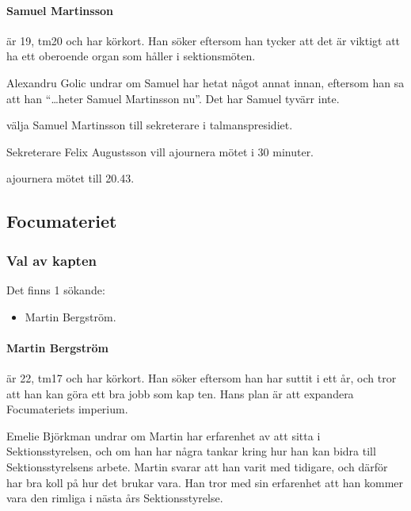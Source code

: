 \documentclass[hidelinks]{sektionsmote}
\begin{document}
\paragraph{Samuel Martinsson} är 19, tm20 och har körkort.
Han söker eftersom han tycker att det är viktigt att ha ett oberoende organ som håller i sektionsmöten.

Alexandru Golic undrar om Samuel har hetat något annat innan, eftersom han sa att han \enquote{\dots heter Samuel Martinsson nu}.
Det har Samuel tyvärr inte.

\begin{beslut}
  \item välja Samuel Martinsson till sekreterare i talmanspresidiet.
\end{beslut}

\begin{ofraga}
  Sekreterare Felix Augustsson vill ajournera mötet i 30 minuter.
  \begin{beslut}
    \item ajournera mötet till 20.43.
  \end{beslut}
\end{ofraga}

\subsection{Focumateriet}

\subsubsection{Val av kapten}
Det finns 1 sökande:
\begin{itemize}
    \item Martin Bergström.
\end{itemize}

\paragraph{Martin Bergström} är 22, tm17 och har körkort.
Han söker eftersom han har suttit i ett år, och tror att han kan göra ett bra jobb som kap ten.
Hans plan är att expandera Focumateriets imperium.

Emelie Björkman undrar om Martin har erfarenhet av att sitta i Sektionsstyrelsen, och om han har några tankar kring hur han kan bidra till Sektionsstyrelsens arbete.
Martin svarar att han varit med tidigare, och därför har bra koll på hur det brukar vara.
Han tror med sin erfarenhet att han kommer vara den rimliga i nästa års Sektionsstyrelse.
\end{document}
